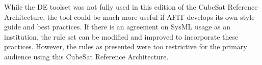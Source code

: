 
While the DE toolset was not fully used in this edition of the CubeSat Reference Architecture, the tool could be much more useful if AFIT develops its own style guide and best practices. If there is an agreement on SysML usage as an institution, the rule set can be modified and improved to incorporate these practices. However, the rules as presented were too restrictive for the primary audience using this CubeSat Reference Architecture. 
